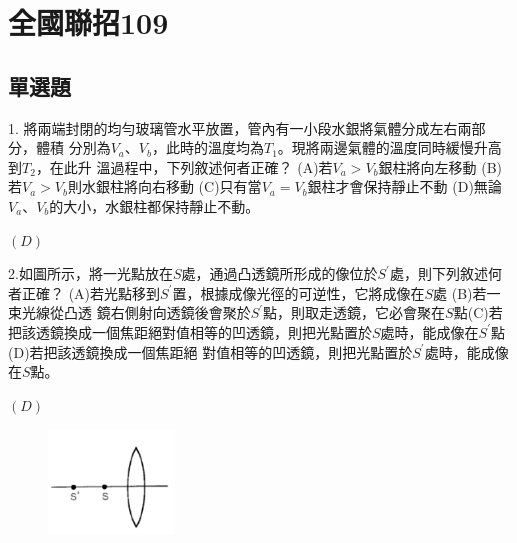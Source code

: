 \documentclass[cn,10pt,math=newtx,chinesefont=founder,device=ig]{elegantbook}
\begin{document}
\newpage


\chapter{全國聯招109}
\section{單選題}

\begin{example}
   1. 將兩端封閉的均勻玻璃管水平放置，管內有一小段水銀將氣體分成左右兩部分，體積
分別為$V_a、V_b$，此時的溫度均為$T_1$。現將兩邊氣體的溫度同時緩慢升高到$T_2$，在此升
溫過程中，下列敘述何者正確？ (A)若$V_a >V_b$銀柱將向左移動 (B)若$V_a > V_b$則水銀柱將向右移動 (C)只有當$V_a = V_b$銀柱才會保持靜止不動 (D)無論$V_a 、 V_b$的大小，水銀柱都保持靜止不動。\\
    \rightline{[高雄聯招教甄109]}
\end{example}
\begin{solution}
    $(D)$
    \end{solution}

\newpage

\begin{example}
   2.如圖所示，將一光點放在$S$處，通過凸透鏡所形成的像位於$S^{'}$處，則下列敘述何者正確？ 
(A)若光點移到$S^{'}$置，根據成像光徑的可逆性，它將成像在$S$處 (B)若一束光線從凸透
鏡右側射向透鏡後會聚於$S^{'}$點，則取走透鏡，它必會聚在$S$點(C)若把該透鏡換成一個焦距絕對值相等的凹透鏡，則把光點置於$S$處時，能成像在$S^{'}$點 (D)若把該透鏡換成一個焦距絕
對值相等的凹透鏡，則把光點置於$S^{'}$處時，能成像在$S$點。
\\
    \rightline{[全國聯招教甄109]}
\end{example}
\begin{solution}
    $(D)$
\end{solution}
\begin{figure}[htbp]
    \flushright
    \includegraphics[width=0.3\textwidth]{image/109全國2.png}
  \end{figure}
\newpage
\end{document}
